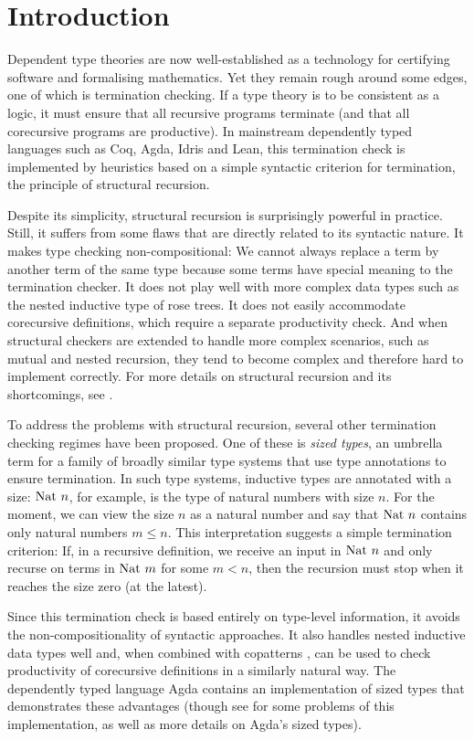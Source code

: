 \chapter{Introduction}

Dependent type theories are now well-established as a technology for certifying
software and formalising mathematics. Yet they remain rough around some edges,
one of which is termination checking. If a type theory is to be consistent as a
logic, it must ensure that all recursive programs terminate (and that all
corecursive programs are productive). In mainstream dependently typed languages
such as Coq, Agda, Idris and Lean, this termination check is implemented by
heuristics based on a simple syntactic criterion for termination, the principle
of structural recursion.

Despite its simplicity, structural recursion is surprisingly powerful in
practice. Still, it suffers from some flaws that are directly related to its
syntactic nature. It makes type checking non-compositional: We cannot always
replace a term by another term of the same type because some terms have special
meaning to the termination checker. It does not play well with more complex data
types such as the nested inductive type of rose trees. It does not easily
accommodate corecursive definitions, which require a separate productivity
check. And when structural checkers are extended to handle more complex
scenarios, such as mutual and nested recursion, they tend to become complex and
therefore hard to implement correctly. For more details on structural recursion
and its shortcomings, see .

To address the problems with structural recursion, several other termination
checking regimes have been proposed. One of these is \emph{sized types}, an
umbrella term for a family of broadly similar type systems that use type
annotations to ensure termination. In such type systems, inductive types are
annotated with a size: $\mathrm{Nat}~n$, for example, is the type of natural numbers
with size $n$. For the moment, we can view the size $n$ as a natural number and
say that $\mathrm{Nat}~n$ contains only natural numbers $m ≤ n$. This interpretation
suggests a simple termination criterion: If, in a recursive definition, we
receive an input in $\mathrm{Nat}~n$ and only recurse on terms in $\mathrm{Nat}~m$ for some $m
< n$, then the recursion must stop when it reaches the size zero (at the
latest).

Since this termination check is based entirely on type-level information, it
avoids the non-compositionality of syntactic approaches. It also handles nested
inductive data types well and, when combined with copatterns \cite{abel2016},
can be used to check productivity of corecursive definitions in a similarly
natural way. The dependently typed language Agda contains an implementation of
sized types that demonstrates these advantages (though see
 for some problems of this implementation, as well as
more details on Agda's sized types).

